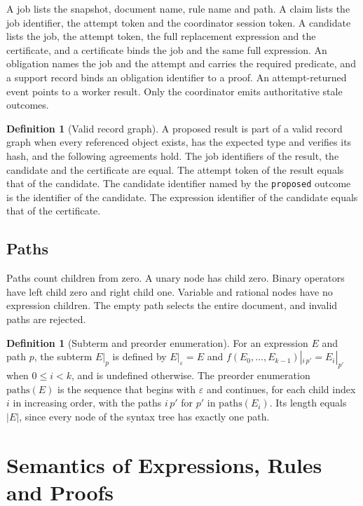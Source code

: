 \documentclass[11pt,a4paper]{article}
\theoremstyle{plain}
\theoremstyle{definition}
\newtheorem{definition}[theorem]{Definition}
\theoremstyle{remark}
\theoremstyle{definition}
\newcommand{\sz}[1]{\lvert #1\rvert}
\newcommand{\code}[1]{\texttt{#1}}
\begin{document}
A job lists the snapshot, document name, rule name and path. A claim lists the job identifier, the attempt token and the coordinator session token. A candidate lists the job, the attempt token, the full replacement expression and the certificate, and a certificate binds the job and the same full expression. An obligation names the job and the attempt and carries the required predicate, and a support record binds an obligation identifier to a proof. An attempt-returned event points to a worker result. Only the coordinator emits authoritative stale outcomes.

\begin{definition}[Valid record graph]
\label{def:graph}
A proposed result is part of a valid record graph when every referenced object exists, has the expected type and verifies its hash, and the following agreements hold. The job identifiers of the result, the candidate and the certificate are equal. The attempt token of the result equals that of the candidate. The candidate identifier named by the \code{proposed} outcome is the identifier of the candidate. The expression identifier of the candidate equals that of the certificate.
\end{definition}

\subsection{Paths}

Paths count children from zero. A unary node has child zero. Binary operators have left child zero and right child one. Variable and rational nodes have no expression children. The empty path selects the entire document, and invalid paths are rejected.

\begin{definition}[Subterm and preorder enumeration]
For an expression $E$ and path $p$, the subterm $E|_p$ is defined by $E|_{\varepsilon} = E$ and $f(E_0, \ldots, E_{k-1})|_{i\,p'} = E_i|_{p'}$ when $0 \le i < k$, and is undefined otherwise. The preorder enumeration $\mathrm{paths}(E)$ is the sequence that begins with $\varepsilon$ and continues, for each child index $i$ in increasing order, with the paths $i\,p'$ for $p'$ in $\mathrm{paths}(E_i)$. Its length equals $\sz{E}$, since every node of the syntax tree has exactly one path.
\end{definition}

\section{Semantics of Expressions, Rules and Proofs}
\label{sec:semantics}
\end{document}
